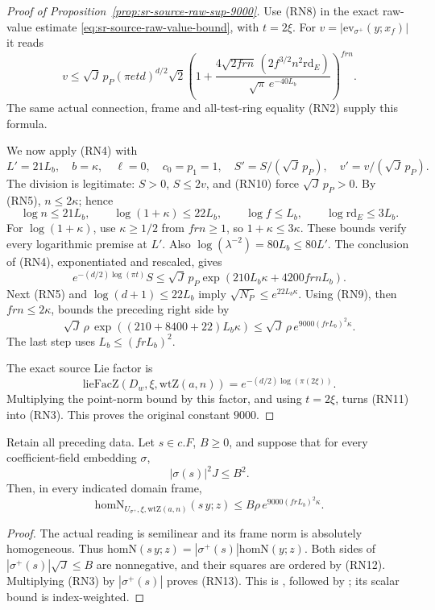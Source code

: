 \begin{proof}[Proof of Proposition~\ref{prop:sr-source-raw-sup-9000}]
Use (RN8) in the exact raw-value estimate
\eqref{eq:sr-source-raw-value-bound}, with \(t=2\xi\).
For \(v=|\mathrm{ev}_{\sigma^+}(y;x_f)|\) it reads
\[
 v\le\sqrt J\,p_P(\pi e t d)^{d/2}\sqrt2
 \left(1+\frac{4\sqrt{2frn}\,(2f^{3/2}n^2\mathrm{rd}_E)}
                        {\sqrt\pi\,e^{-40L_b}}\right)^{frn}.
 \tag{RN10}\label{eq:sr-source-raw-numeric-input}
\]
The same actual connection, frame and all-test-ring equality
(RN2) supply this formula.

We now apply (RN4) with
\[
 L'=21L_b,\quad b=\kappa,\quad \ell=0,\quad
 c_0=p_1=1,\quad
 S'=S/(\sqrt J\,p_P),\quad v'=v/(\sqrt J\,p_P).
\]
The division is legitimate:
\(S>0\), \(S\le2v\), and (RN10) force \(\sqrt J\,p_P>0\).
By (RN5), \(n\le2\kappa\); hence
\[
 \log n\le21L_b,\qquad
 \log(1+\kappa)\le22L_b,\qquad
 \log f\le L_b,\qquad
 \log\mathrm{rd}_E\le3L_b.
\]
For \(\log(1+\kappa)\), use \(\kappa\ge1/2\) from
\(frn\ge1\), so \(1+\kappa\le3\kappa\).
These bounds verify every logarithmic premise at \(L'\).
Also \(\log(\lambda^{-2})=80L_b\le80L'\).
The conclusion of (RN4), exponentiated and rescaled, gives
\[
 e^{-(d/2)\log(\pi t)}S
 \le\sqrt J\,p_P
       \exp\!\left(210L_b\kappa+4200frnL_b\right).
\]
Next (RN5) and \(\log(d+1)\le22L_b\) imply
\(\sqrt{N_P}\le e^{22L_b\kappa}\).
Using (RN9), then \(frn\le2\kappa\), bounds the preceding
right side by
\[
 \sqrt J\,\rho\,
 \exp\!\left((210+8400+22)L_b\kappa\right)
 \le\sqrt J\,\rho\,
                    e^{9000(frL_b)^2\kappa}.
 \tag{RN11}\label{eq:sr-source-raw-final-number}
\]
The last step uses \(L_b\le(frL_b)^2\).

The exact source Lie factor is
\[
 \mathrm{lieFacZ}(D_w,\xi,\mathrm{wtZ}(a,n))
                 =e^{-(d/2)\log(\pi(2\xi))}.
\]
Multiplying the point-norm bound by this factor, and using
\(t=2\xi\), turns (RN11) into (RN3).
This proves the original constant \(9000\).
\end{proof}

\begin{srcorollary}\label{cor:sr-source-smul-raw-sup-9000}
Retain all preceding data.
Let \(s\in c.F\), \(B\ge0\), and suppose that for every
coefficient-field embedding \(\sigma\),
\[
                         |\sigma(s)|^2J\le B^2 .
 \tag{RN12}\label{eq:sr-source-raw-scalar-bound}
\]
Then, in every indicated domain frame,
\[
 \mathrm{homN}_{U_{\sigma^+},\xi,\mathrm{wtZ}(a,n)}(s\,y;z)
              \le B\rho\,e^{9000(frL_b)^2\kappa}.
 \tag{RN13}\label{eq:sr-source-smul-raw-sup-9000}
\]
\end{srcorollary}
\begin{proof}
The actual reading is semilinear and its frame norm is
absolutely homogeneous.  Thus
\(\mathrm{homN}(s\,y;z)=|\sigma^+(s)|\mathrm{homN}(y;z)\).
Both sides of
\(|\sigma^+(s)|\sqrt J\le B\) are nonnegative, and their
squares are ordered by (RN12).
Multiplying (RN3) by \(|\sigma^+(s)|\) proves (RN13).
This is , followed by
; its scalar bound is index-weighted.
\end{proof}

